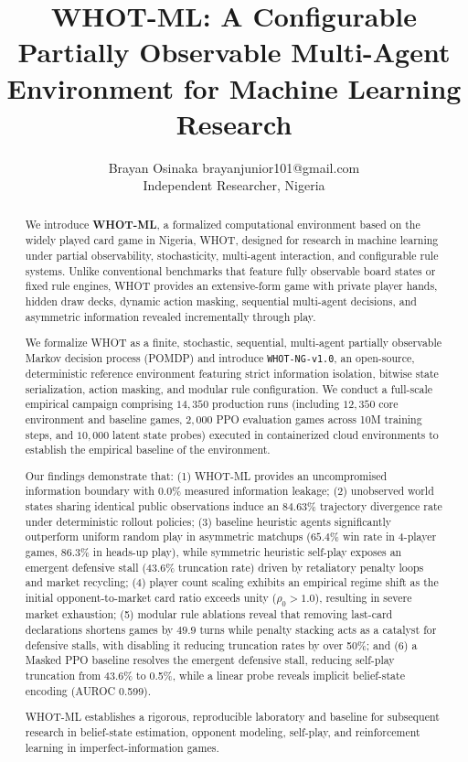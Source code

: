 \documentclass[11pt]{article}
\title{\textbf{WHOT-ML: A Configurable Partially Observable Multi-Agent Environment for Machine Learning Research}}
\author{\name Brayan Osinaka \email brayanjunior101@gmail.com \\
        \addr Independent Researcher, Nigeria}
\begin{document}
\maketitle

\begin{abstract}

We introduce \textbf{WHOT-ML}, a formalized computational environment based on the widely played card game in Nigeria, WHOT, designed for research in machine learning under partial observability, stochasticity, multi-agent interaction, and configurable rule systems. Unlike conventional benchmarks that feature fully observable board states or fixed rule engines, WHOT provides an extensive-form game with private player hands, hidden draw decks, dynamic action masking, sequential multi-agent decisions, and asymmetric information revealed incrementally through play.

We formalize WHOT as a finite, stochastic, sequential, multi-agent partially observable Markov decision process (POMDP) and introduce \texttt{WHOT-NG-v1.0}, an open-source, deterministic reference environment featuring strict information isolation, bitwise state serialization, action masking, and modular rule configuration. We conduct a full-scale empirical campaign comprising $14{,}350$ production runs (including $12{,}350$ core environment and baseline games, $2{,}000$ PPO evaluation games across 10M training steps, and $10{,}000$ latent state probes) executed in containerized cloud environments to establish the empirical baseline of the environment.

Our findings demonstrate that: (1) WHOT-ML provides an uncompromised information boundary with $0.0\%$ measured information leakage; (2) unobserved world states sharing identical public observations induce an $84.63\%$ trajectory divergence rate under deterministic rollout policies; (3) baseline heuristic agents significantly outperform uniform random play in asymmetric matchups ($65.4\%$ win rate in 4-player games, $86.3\%$ in heads-up play), while symmetric heuristic self-play exposes an emergent defensive stall (43.6\% truncation rate) driven by retaliatory penalty loops and market recycling; (4) player count scaling exhibits an empirical regime shift as the initial opponent-to-market card ratio exceeds unity ($\rho_0 > 1.0$), resulting in severe market exhaustion; (5) modular rule ablations reveal that removing last-card declarations shortens games by $49.9$ turns while penalty stacking acts as a catalyst for defensive stalls, with disabling it reducing truncation rates by over 50\%; and (6) a Masked PPO baseline resolves the emergent defensive stall, reducing self-play truncation from 43.6\% to 0.5\%, while a linear probe reveals implicit belief-state encoding (AUROC 0.599).

WHOT-ML establishes a rigorous, reproducible laboratory and baseline for subsequent research in belief-state estimation, opponent modeling, self-play, and reinforcement learning in imperfect-information games.


\end{abstract}
\end{document}
